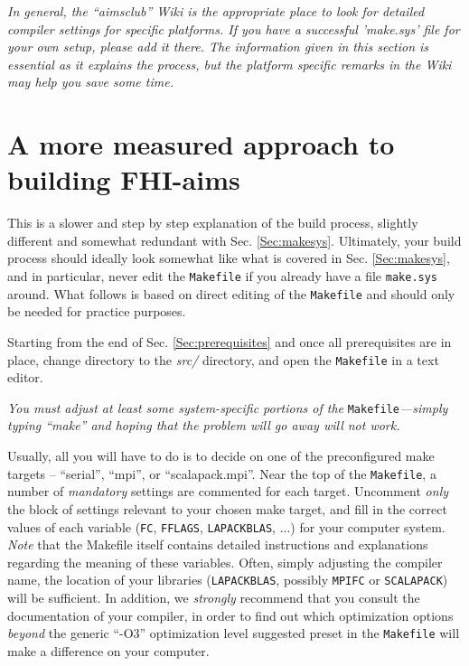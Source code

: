 \emph{In general, the ``aimsclub'' Wiki is the appropriate place to
  look for detailed compiler settings for specific platforms. If you
  have a successful 'make.sys' file for your own setup, please add 
  it there. The information given in this section is essential as it
  explains the process, but the platform specific remarks in the Wiki
  may help you save some time.} 

\section{A more measured approach to building FHI-aims}
\label{Sec:build}

This is a slower and step by step explanation of the build process,
slightly different and somewhat redundant with
Sec. \ref{Sec:makesys}. Ultimately, your build process should ideally
look somewhat like what is covered in Sec. \ref{Sec:makesys}, and in
particular, never edit the \texttt{Makefile} if you already have a
file \texttt{make.sys} around. What follows is based on direct editing
of the \texttt{Makefile} and should only be needed for practice
purposes. 

Starting from the end of Sec. \ref{Sec:prerequisites} and once all
prerequisites are in place, change directory to the \emph{src/} 
directory, and open the \texttt{Makefile} in a text editor. 

\begin{center}
  \parbox[c]{0.8\textwidth}
  {
  \emph{You must
  adjust at least some system-specific portions of the} \texttt{Makefile}\emph{---simply typing
  ``make'' and hoping that the problem will go away will not work.}
  }
\end{center}

Usually, all you will have to do is to decide on one of the preconfigured make
targets -- ``serial'', ``mpi'', or ``scalapack.mpi''. Near the top of the
\texttt{Makefile}, a number of \emph{mandatory} settings are commented for each
target. Uncomment \emph{only} the block of settings relevant to your chosen
make target, and fill in the correct values of each variable (\texttt{FC},
\texttt{FFLAGS}, \texttt{LAPACKBLAS}, ...) for your computer
system. \emph{Note} that the Makefile itself contains detailed instructions
and explanations regarding the meaning of these variables. Often, simply
adjusting the compiler name, the location of your libraries
(\texttt{LAPACKBLAS}, possibly \texttt{MPIFC} or \texttt{SCALAPACK}) will be
sufficient. In addition, we \emph{strongly} recommend that you consult the
documentation of  your compiler, in order to find out which optimization
options \emph{beyond} the generic ``-O3'' optimization level suggested preset in the
\texttt{Makefile} will make a  difference on your computer.

